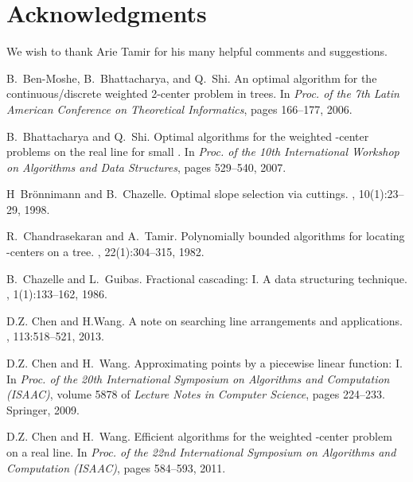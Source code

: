 \documentclass{llncs}
\begin{document}
\section*{Acknowledgments}

We wish to thank Arie Tamir for his many helpful comments and suggestions.





\footnotesize \baselineskip=11.0pt



\begin{thebibliography}{10}

B.~Ben-Moshe, B.~Bhattacharya, and Q.~Shi.
\newblock An optimal algorithm for the continuous/discrete weighted 2-center
  problem in trees.
\newblock In {\em Proc. of the 7th Latin American Conference on Theoretical
  Informatics}, pages 166--177, 2006.

B.~Bhattacharya and Q.~Shi.
\newblock Optimal algorithms for the weighted -center problems on the real
  line for small .
\newblock In {\em Proc. of the 10th International Workshop on Algorithms and
  Data Structures}, pages 529--540, 2007.

H~{Br\"onnimann} and B.~Chazelle.
\newblock Optimal slope selection via cuttings.
, 10(1):23--29,
  1998.

R.~Chandrasekaran and A.~Tamir.
\newblock Polynomially bounded algorithms for locating {-centers} on a tree.
, 22(1):304--315, 1982.

B.~Chazelle and L.~Guibas.
\newblock Fractional cascading: {I. A} data structuring technique.
, 1(1):133--162, 1986.

D.Z. Chen and H.Wang.
\newblock A note on searching line arrangements and applications.
, 113:518--521, 2013.

D.Z. Chen and H.~Wang.
\newblock Approximating points by a piecewise linear function: {I}.
\newblock In {\em Proc. of the 20th International Symposium on Algorithms and
  Computation (ISAAC)}, volume 5878 of {\em Lecture Notes in Computer Science},
  pages 224--233. Springer, 2009.

D.Z. Chen and H.~Wang.
\newblock Efficient algorithms for the weighted {}-center problem on a real
  line.
\newblock In {\em Proc. of the 22nd International Symposium on Algorithms and
  Computation (ISAAC)}, pages 584--593, 2011.


\end{thebibliography}
\end{document}
